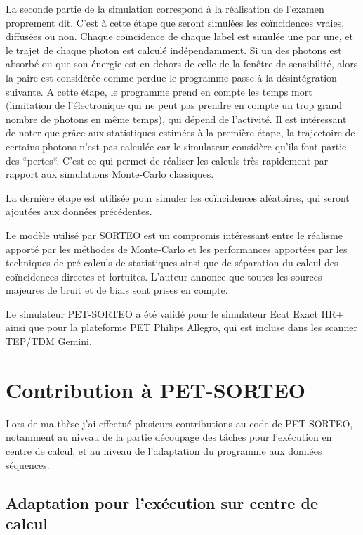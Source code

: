 La seconde partie de la simulation correspond à la réalisation de l'examen proprement dit. C'est à cette étape que seront simulées les coïncidences vraies, diffusées ou non. Chaque coïncidence de chaque label est simulée une par une, et le trajet de chaque photon est calculé indépendamment. Si un des photons est absorbé ou que son énergie est en dehors de celle de la fenêtre de sensibilité, alors la paire est considérée comme perdue le programme passe à la désintégration suivante. A cette étape, le programme prend en compte les temps mort (limitation de l'électronique qui ne peut pas prendre en compte un trop grand nombre de photons en même temps), qui dépend de l'activité. Il est intéressant de noter que grâce aux statistiques estimées à la première étape, la trajectoire de certains photons n'est pas calculée car le simulateur considère qu'ils font partie des ``pertes``. C'est ce qui permet de réaliser les calculs très rapidement par rapport aux simulations Monte-Carlo classiques.

La dernière étape est utilisée pour simuler les coïncidences aléatoires, qui seront ajoutées aux données précédentes.


Le modèle utilisé par SORTEO est un compromis intéressant entre le réalisme apporté par les méthodes de Monte-Carlo et les performances apportées par les techniques de pré-calculs de statistiques ainsi que de séparation du calcul des coïncidences directes et fortuites. L'auteur annonce que toutes les sources majeures de bruit et de biais sont prises en compte.

Le simulateur PET-SORTEO a été validé pour le simulateur Ecat Exact HR+~\cite{reilhac2004pet} ainsi que pour la plateforme PET Philips Allegro, qui est incluse dans les scanner TEP/TDM Gemini. 


	\section{Contribution à PET-SORTEO}

Lors de ma thèse j'ai effectué plusieurs contributions au code de PET-SORTEO, notamment au niveau de la partie découpage des tâches pour l'exécution en centre de calcul, et au niveau de l'adaptation du programme aux données séquences.

\subsection{Adaptation pour l'exécution sur centre de calcul}

